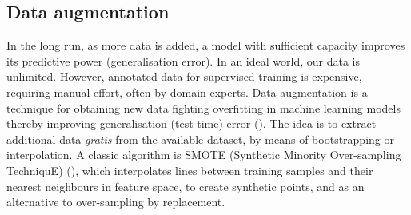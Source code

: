 
\subsection{Data augmentation}

In the long run, as more data is added, a model with sufficient capacity improves its predictive power (generalisation error). In an ideal world, our data is unlimited. However, annotated data for supervised training is expensive, requiring manual effort, often by domain experts. Data augmentation is a technique for obtaining new data fighting overfitting in machine learning models thereby improving generalisation (test time) error (\cite{shorten2019survey}). The idea is to extract additional data \emph{gratis} from the available dataset, by means of bootstrapping or interpolation. A classic algorithm is SMOTE (Synthetic Minority Over-sampling TechniquE) (\cite{chawla2002smote}), which interpolates lines between training samples and their nearest neighbours in feature space, to create synthetic points, and as an alternative to over-sampling by replacement.

